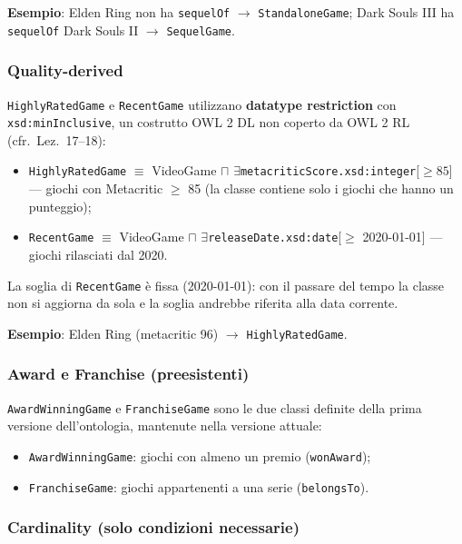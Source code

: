 \textbf{Esempio}: Elden Ring non ha \texttt{sequelOf} $\rightarrow$ \texttt{StandaloneGame};
Dark Souls III ha \texttt{sequelOf} Dark Souls II $\rightarrow$ \texttt{SequelGame}.

\subsubsection{Quality-derived}

\texttt{HighlyRatedGame} e \texttt{RecentGame} utilizzano \textbf{datatype restriction}
con \texttt{xsd:minInclusive}, un costrutto OWL 2 DL non coperto da OWL 2 RL
(cfr.~Lez.~17--18):

\begin{itemize}[nosep]
  \item \texttt{HighlyRatedGame} $\equiv$ VideoGame $\sqcap$ $\exists$\texttt{metacriticScore.xsd:integer}[$\geq 85$]
    --- giochi con Metacritic $\geq$ 85 (la classe contiene solo i giochi che hanno un punteggio);
  \item \texttt{RecentGame} $\equiv$ VideoGame $\sqcap$ $\exists$\texttt{releaseDate.xsd:date}[$\geq$ 2020-01-01]
    --- giochi rilasciati dal 2020.
\end{itemize}

La soglia di \texttt{RecentGame} \`e fissa (2020-01-01): con il passare del tempo la classe non si
aggiorna da sola e la soglia andrebbe riferita alla data corrente.

\textbf{Esempio}: Elden Ring (metacritic 96) $\rightarrow$ \texttt{HighlyRatedGame}.

\subsubsection{Award e Franchise (preesistenti)}

\texttt{AwardWinningGame} e \texttt{FranchiseGame} sono le due classi definite
della prima versione dell'ontologia, mantenute nella versione attuale:
\begin{itemize}[nosep]
  \item \texttt{AwardWinningGame}: giochi con almeno un premio (\texttt{wonAward});
  \item \texttt{FranchiseGame}: giochi appartenenti a una serie (\texttt{belongsTo}).
\end{itemize}

\subsubsection{Cardinality (solo condizioni necessarie)}


